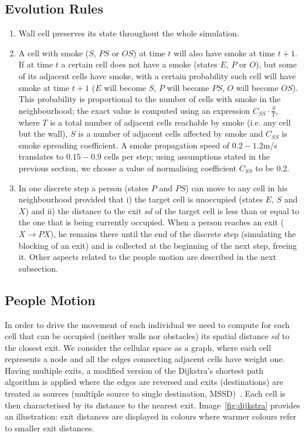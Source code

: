 \subsection{Evolution Rules}
\begin{enumerate}
    \item Wall cell preserves its state throughout the whole simulation.

    \item A cell with smoke ($S$, $PS$ or $OS$) at time $t$ will also have smoke
    at time $t+1$.
    If at time $t$ a certain cell does not have a smoke (states $E$, $P$ or
    $O$), but some of its adjacent cells have smoke, with a certain probability
    such cell will have smoke at time $t+1$ ($E$ will become $S$, $P$ will
    become $PS$, $O$ will become $OS$).
    This probability is proportional to the number of cells with smoke in the
    neighbourhood; the exact value is computed using an expression
    $C_{SS} \cdot \frac{S}{T}$, where $T$ is a total number of adjacent
    cells reachable by smoke (i.e. any cell but the wall), $S$ is a number
    of adjacent cells affected by smoke and $C_{SS}$ is smoke spreading
    coefficient.
    A smoke propagation speed of $0.2-1.2$m/s translates to $0.15-0.9$ cells
    per step; using assumptions stated in the previous section, we choose a
    value of normalising coefficient $C_{SS}$ to be 0.2.
    
    \item In one discrete step a person (states $P$ and $PS$) can move to
    any cell in his neighbourhood provided that i) the target cell is
    unoccupied (states $E$, $S$ and $X$) and ii) the distance to the exit
    $sd$ of the target cell is less than or equal to the one that is being
    currently occupied.
    When a person reaches an exit ($X \rightarrow PX$), he remains there until
    the end of the discrete step (simulating the blocking of an exit) and is
    collected at the beginning of the next step, freeing it.
    Other aspects related to the people motion are described in the next
    subsection.
\end{enumerate}

\subsection{People Motion}
In order to drive the movement of each individual we need to compute for each
cell that can be occupied (neither walls nor obstacles) its spatial distance
$sd$ to the closest exit.
We consider the cellular space as a graph, where each cell represents a node and
all the edges connecting adjacent cells have weight one.
Having multiple exits, a modified version of the Dijkstra's shortest path
algorithm is applied where the edges are reversed and exits (destinations) are
treated as sources (multiple source to single destination, MSSD)~\cite{Dijkstra}.
Each cell is then characterised by its distance to the nearest exit.
Image~\ref{fig:dijkstra} provides an illustration: exit distances are
displayed in colours where warmer colours refer to smaller exit distances.

